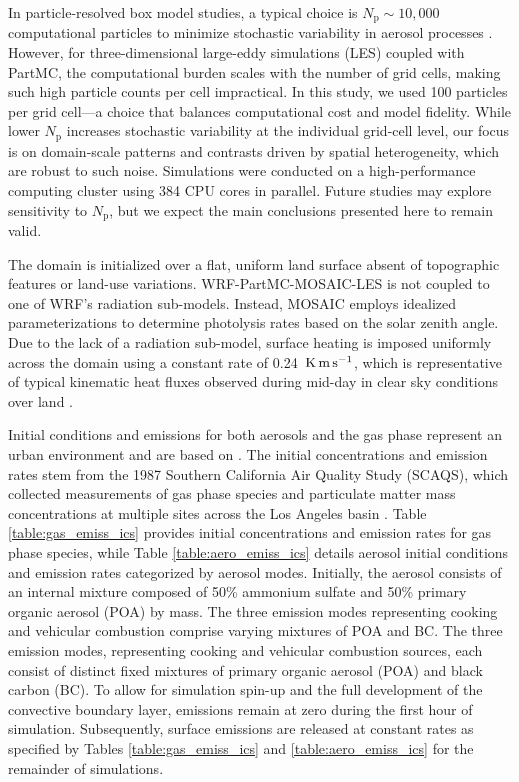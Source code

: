 \documentclass[journal abbreviation, manuscript]{copernicus}
\begin{document}
In particle-resolved box model studies, a typical choice is
  $N_{\mathrm{p}} \sim 10{,}000$ computational particles to minimize
  stochastic variability in aerosol processes
  \citep{gmd-17-8399-2024, Liu_2025}.  However, for
  three-dimensional large-eddy simulations (LES) coupled with PartMC,
  the computational burden scales with the number of grid cells,
  making such high particle counts per cell impractical. In this
  study, we used 100 particles per grid cell—a choice that balances
  computational cost and model fidelity. While lower $N_{\mathrm{p}}$
  increases stochastic variability at the individual grid-cell level,
  our focus is on domain-scale patterns and contrasts driven by
  spatial heterogeneity, which are robust to such noise. Simulations
  were conducted on a high-performance computing cluster using 384 CPU
  cores in parallel. Future studies may explore sensitivity to
  $N_{\mathrm{p}}$, but we expect the main conclusions presented here
  to remain valid.

The domain is initialized over a flat, uniform land surface absent of
topographic features or land-use variations. WRF-PartMC-MOSAIC-LES is
not coupled to one of WRF's radiation sub-models. Instead, MOSAIC
employs idealized parameterizations to determine photolysis rates
based on the solar zenith angle. Due to the lack of a radiation
sub-model, surface heating is imposed uniformly across the domain
using a constant rate of 0.24~$\rm K \, m \, s^{-1}$, which is
representative of typical kinematic heat fluxes observed during
mid-day in clear sky conditions over land
\citep{stull_introduction_1988}.

Initial conditions and emissions for both aerosols and the gas phase
represent an urban environment and are based on
\citet{riemer_simulating_2009}. The initial concentrations and
emission rates stem from the 1987 Southern California Air Quality
Study (SCAQS), which collected measurements of gas phase species and
particulate matter mass concentrations at multiple sites across the
Los Angeles basin \citep{zaveri_model_2008}. Table
\ref{table:gas_emiss_ics} provides initial concentrations and emission
rates for gas phase species, while Table \ref{table:aero_emiss_ics}
details aerosol initial conditions and emission rates categorized by
aerosol modes. Initially, the aerosol consists of an internal mixture
composed of 50\% ammonium sulfate and 50\% primary organic aerosol
(POA) by mass.  The three emission modes representing cooking and
vehicular combustion comprise varying mixtures of POA and BC. The
three emission modes, representing cooking and vehicular combustion
sources, each consist of distinct fixed mixtures of primary organic
aerosol (POA) and black carbon (BC). To allow for simulation spin-up
and the full development of the convective boundary layer, emissions
remain at zero during the first hour of simulation. Subsequently,
surface emissions are released at constant rates as specified by
Tables \ref{table:gas_emiss_ics} and \ref{table:aero_emiss_ics} for
the remainder of simulations.
\end{document}
